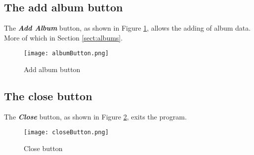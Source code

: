 \subsection{The add album button}
The 
\textbf{\textit{Add Album}}
button, as shown in Figure 
\ref{fig:Add album button},
allows the adding of album data.  More of which in Section 
\ref{sect:albums}.
\begin{figure}[!h]
  \texttt{[image: albumButton.png]}
  \caption{Add album button}
  \label{fig:Add album button}
\end{figure}

\subsection{The close button}
The 
\textbf{\textit{Close}}
button, as shown in Figure 
\ref{fig:Close button},
exits the program.
\begin{figure}[!h]
  \texttt{[image: closeButton.png]}
  \caption{Close button}
  \label{fig:Close button}
\end{figure}